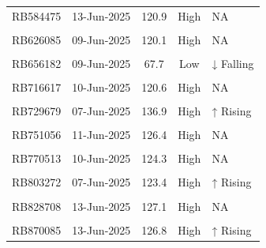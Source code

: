 \documentclass[
]{article}
\begin{document}
\begin{table}[!h]
\begin{tabular}[t]{lcccl}
\addlinespace
RB584475 & 13-Jun-2025 & 120.9 & High & NA\\
\cellcolor{gray!10}{RB601923} & \cellcolor{gray!10}{07-Jun-2025} & \cellcolor{gray!10}{124.0} & \cellcolor{gray!10}{High} & \cellcolor{gray!10}{↑ Rising}\\
RB626085 & 09-Jun-2025 & 120.1 & High & NA\\
\cellcolor{gray!10}{RB638926} & \cellcolor{gray!10}{08-Jun-2025} & \cellcolor{gray!10}{125.3} & \cellcolor{gray!10}{High} & \cellcolor{gray!10}{NA}\\
RB656182 & 09-Jun-2025 & 67.7 & Low & ↓ Falling\\
\addlinespace
\cellcolor{gray!10}{RB683839} & \cellcolor{gray!10}{08-Jun-2025} & \cellcolor{gray!10}{124.3} & \cellcolor{gray!10}{High} & \cellcolor{gray!10}{↑ Rising}\\
RB716617 & 10-Jun-2025 & 120.6 & High & NA\\
\cellcolor{gray!10}{RB725105} & \cellcolor{gray!10}{11-Jun-2025} & \cellcolor{gray!10}{124.4} & \cellcolor{gray!10}{High} & \cellcolor{gray!10}{↑ Rising}\\
RB729679 & 07-Jun-2025 & 136.9 & High & ↑ Rising\\
\cellcolor{gray!10}{RB751053} & \cellcolor{gray!10}{10-Jun-2025} & \cellcolor{gray!10}{129.9} & \cellcolor{gray!10}{High} & \cellcolor{gray!10}{NA}\\
\addlinespace
RB751056 & 11-Jun-2025 & 126.4 & High & NA\\
\cellcolor{gray!10}{RB752587} & \cellcolor{gray!10}{11-Jun-2025} & \cellcolor{gray!10}{121.8} & \cellcolor{gray!10}{High} & \cellcolor{gray!10}{NA}\\
RB770513 & 10-Jun-2025 & 124.3 & High & NA\\
\cellcolor{gray!10}{RB776159} & \cellcolor{gray!10}{10-Jun-2025} & \cellcolor{gray!10}{123.4} & \cellcolor{gray!10}{High} & \cellcolor{gray!10}{NA}\\
RB803272 & 07-Jun-2025 & 123.4 & High & ↑ Rising\\
\addlinespace
\cellcolor{gray!10}{RB820613} & \cellcolor{gray!10}{08-Jun-2025} & \cellcolor{gray!10}{122.5} & \cellcolor{gray!10}{High} & \cellcolor{gray!10}{NA}\\
RB828708 & 13-Jun-2025 & 127.1 & High & NA\\
\cellcolor{gray!10}{RB841991} & \cellcolor{gray!10}{07-Jun-2025} & \cellcolor{gray!10}{120.1} & \cellcolor{gray!10}{High} & \cellcolor{gray!10}{↑ Rising}\\
RB870085 & 13-Jun-2025 & 126.8 & High & ↑ Rising\\

\end{tabular}
\end{table}
\end{document}
